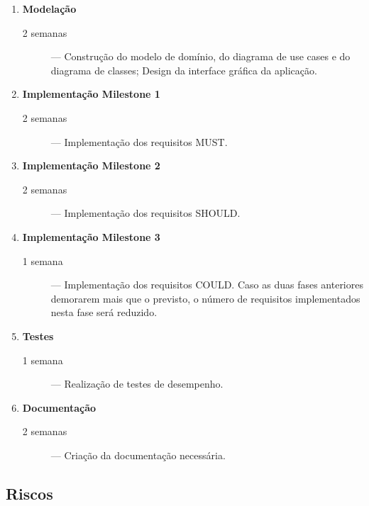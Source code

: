\documentclass[12pt,a4paper]{article}
\begin{document}
    \begin{enumerate}
      \item \textbf{Modelação} \hfill
        \begin{description}
          \item[2 semanas] --- Construção do modelo de domínio, do diagrama de use cases e do diagrama de classes; Design da interface gráfica da aplicação.
        \end{description}
      \item \textbf{Implementação Milestone 1}\hfill
        \begin{description}
          \item[2 semanas] --- Implementação dos requisitos MUST.
        \end{description}
      \item \textbf{Implementação Milestone 2}\hfill
        \begin{description}
          \item[2 semanas] --- Implementação dos requisitos SHOULD.
        \end{description}
      \item \textbf{Implementação Milestone 3}\hfill
        \begin{description}
          \item[1 semana] --- Implementação dos requisitos COULD. Caso as duas fases anteriores demorarem mais que o previsto, o número de requisitos implementados nesta fase será reduzido.
        \end{description}
      \item \textbf{Testes}\hfill
        \begin{description}
          \item[1 semana] --- Realização de testes de desempenho.
        \end{description}
      \item \textbf{Documentação}\hfill
        \begin{description}
          \item[2 semanas] --- Criação da documentação necessária.
        \end{description}
          
    \end{enumerate}

  \subsection{Riscos}
\end{document}
